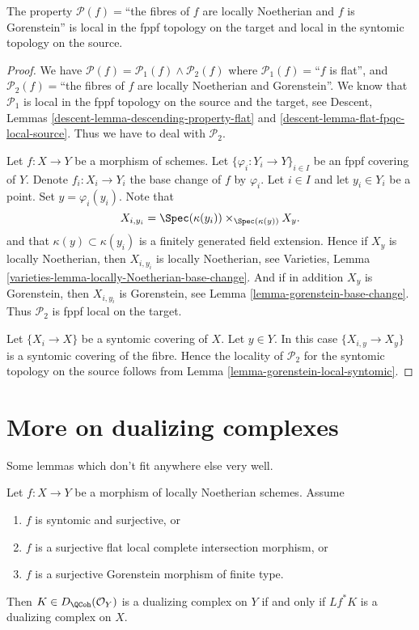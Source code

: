 \begin{lemma}
\label{lemma-gorenstein-local-source-and-target}
The property
$\mathcal{P}(f)=$``the fibres of $f$ are locally Noetherian and $f$ is
Gorenstein'' is local in the fppf topology on the target and
local in the syntomic topology on the source.
\end{lemma}

\begin{proof}
We have
$\mathcal{P}(f) =
\mathcal{P}_1(f) \wedge \mathcal{P}_2(f)$
where
$\mathcal{P}_1(f)=$``$f$ is flat'', and
$\mathcal{P}_2(f)=$``the fibres of $f$ are locally Noetherian
and Gorenstein''.
We know that $\mathcal{P}_1$ is
local in the fppf topology on the source and the target, see
Descent, Lemmas \ref{descent-lemma-descending-property-flat} and
\ref{descent-lemma-flat-fpqc-local-source}. Thus we have to deal
with $\mathcal{P}_2$.

\medskip\noindent
Let $f : X \to Y$ be a morphism of schemes.
Let $\{\varphi_i : Y_i \to Y\}_{i \in I}$ be an fppf covering of $Y$.
Denote $f_i : X_i \to Y_i$ the base change of $f$ by $\varphi_i$.
Let $i \in I$ and let $y_i \in Y_i$ be a point.
Set $y = \varphi_i(y_i)$. Note that
$$
X_{i, y_i} = \Spec(\kappa(y_i)) \times_{\Spec(\kappa(y))} X_y.
$$
and that $\kappa(y) \subset \kappa(y_i)$ is a finitely generated field
extension. Hence if $X_y$ is locally Noetherian, then
$X_{i, y_i}$ is locally Noetherian, see
Varieties, Lemma \ref{varieties-lemma-locally-Noetherian-base-change}.
And if in addition $X_y$ is Gorenstein,
then $X_{i, y_i}$ is Gorenstein, see
Lemma \ref{lemma-gorenstein-base-change}.
Thus $\mathcal{P}_2$ is fppf local on the target.

\medskip\noindent
Let $\{X_i \to X\}$ be a syntomic covering of $X$.
Let $y \in Y$. In this case $\{X_{i, y} \to X_y\}$ is a
syntomic covering of the fibre. Hence the locality of $\mathcal{P}_2$
for the syntomic topology on the source follows from
Lemma \ref{lemma-gorenstein-local-syntomic}.
\end{proof}




\section{More on dualizing complexes}
\label{section-more-dualizing}

\noindent
Some lemmas which don't fit anywhere else very well.

\begin{lemma}
\label{lemma-descent-ascent}
Let $f : X \to Y$ be a morphism of locally Noetherian schemes. Assume
\begin{enumerate}
\item $f$ is syntomic and surjective, or
\item $f$ is a surjective flat local complete intersection morphism, or
\item $f$ is a surjective Gorenstein morphism of finite type.
\end{enumerate}
Then $K \in D_\QCoh(\mathcal{O}_Y)$ is a dualizing complex on $Y$ if and only
if $Lf^*K$ is a dualizing complex on $X$.
\end{lemma}

